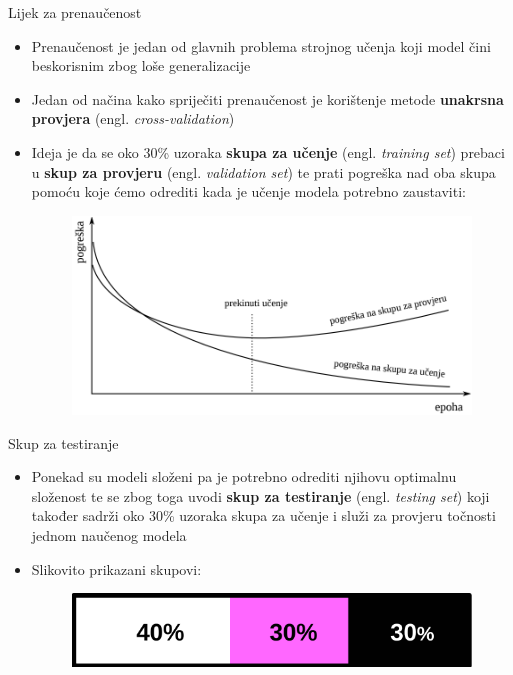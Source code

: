 \documentclass{beamer}
\begin{document}
	\begin{frame}{Lijek za prenaučenost}
	    \begin{itemize}
	        \pause
	        \item Prenaučenost je jedan od glavnih problema strojnog učenja koji model čini beskorisnim zbog loše generalizacije
	        \pause
	        \item Jedan od načina kako spriječiti prenaučenost je korištenje metode \textbf{unakrsna provjera} (engl. \textit{cross-validation})
	        \pause
	        \item Ideja je da se oko 30\% uzoraka \textbf{skupa za učenje} (engl. \textit{training set}) prebaci u \textbf{skup za provjeru} (engl. \textit{validation set}) te prati pogreška nad oba skupa pomoću koje ćemo odrediti kada je učenje modela potrebno zaustaviti:
	        \smallskip
	        \pause
	        \begin{figure}
			    \includegraphics[scale=0.35]{img/cross-validation.png}
		    \end{figure}
	    \end{itemize}
	\end{frame}
    \begin{frame}{Skup za testiranje}
        \begin{itemize}
            \pause
            \item Ponekad su modeli složeni pa je potrebno odrediti njihovu optimalnu složenost te se zbog toga uvodi \textbf{skup za testiranje} (engl. \textit{testing set}) koji također sadrži oko 30\% uzoraka skupa za učenje i služi za provjeru točnosti jednom naučenog modela
            \pause
            \item Slikovito prikazani skupovi:
            \bigskip
            \begin{figure}
			    \includegraphics[scale=0.35]{img/skupovi.png}
		    \end{figure}
        \end{itemize}
    \end{frame}
\end{document}
